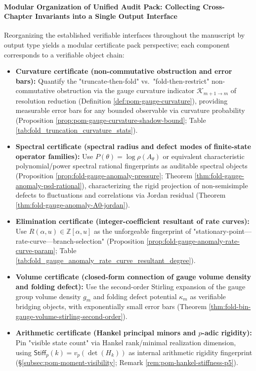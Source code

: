 \paragraph{Modular Organization of Unified Audit Pack: Collecting Cross-Chapter Invariants into a Single Output Interface}
Reorganizing the established verifiable interfaces throughout the manuscript by output type yields a modular certificate pack perspective; each component corresponds to a verifiable object chain:
\begin{itemize}
  \item \textbf{Curvature certificate (non-commutative obstruction and error bars):}
  Quantify the "truncate-then-fold" vs.\ "fold-then-restrict" non-commutative obstruction via the gauge curvature indicator \(\mathcal K_{m+1\to m}\) of resolution reduction (Definition \ref{def:pom-gauge-curvature}), providing measurable error bars for any bounded observable via curvature probability (Proposition \ref{prop:pom-gauge-curvature-shadow-bound}; Table \ref{tab:fold_truncation_curvature_stats}).
  \item \textbf{Spectral certificate (spectral radius and defect modes of finite-state operator families):}
  Use \(P(\theta)=\log\rho(A_\theta)\) or equivalent characteristic polynomial/power spectral rational fingerprints as auditable spectral objects (Proposition \ref{prop:fold-gauge-anomaly-pressure}; Theorem \ref{thm:fold-gauge-anomaly-psd-rational}), characterizing the rigid projection of non-semisimple defects to fluctuations and correlations via Jordan residual (Theorem \ref{thm:fold-gauge-anomaly-A0-jordan}).
  \item \textbf{Elimination certificate (integer-coefficient resultant of rate curves):}
  Use \(R(\alpha,u)\in\mathbb Z[\alpha,u]\) as the unforgeable fingerprint of "stationary-point—rate-curve—branch-selection" (Proposition \ref{prop:fold-gauge-anomaly-rate-curve-param}; Table \ref{tab:fold_gauge_anomaly_rate_curve_resultant_degree}).
  \item \textbf{Volume certificate (closed-form connection of gauge volume density and folding defect):}
  Use the second-order Stirling expansion of the gauge group volume density \(g_m\) and folding defect potential \(\kappa_m\) as verifiable bridging objects, with exponentially small error bars (Theorem \ref{thm:fold-bin-gauge-volume-stirling-second-order}).
  \item \textbf{Arithmetic certificate (Hankel principal minors and \texorpdfstring{$p$}{p}-adic rigidity):}
  Pin "visible state count" via Hankel rank/minimal realization dimension, using \(\mathsf{Stiff}_p(k)=v_p(\det(H_k))\) as internal arithmetic rigidity fingerprint (\S\ref{subsec:pom-moment-visibility}; Remark \ref{rem:pom-hankel-stiffness-p5}).

\end{itemize}
